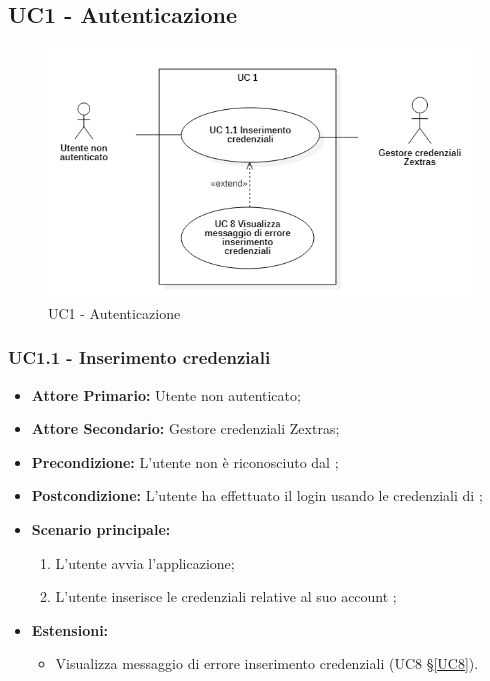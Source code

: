 \subsection{UC1 - Autenticazione}
\begin{figure}[H]
    \centering
    \includegraphics[scale = 0.7]{components/img/UC1.png}
    \caption{UC1 - Autenticazione}
\end{figure}
\subsubsection{UC1.1 - Inserimento credenziali}
\begin{itemize}
\item \textbf{Attore Primario:} Utente non autenticato;
\item \textbf{Attore Secondario:} Gestore credenziali Zextras;
\item \textbf{Precondizione:} L'utente non è riconosciuto dal ;
\item \textbf{Postcondizione:} L'utente ha effettuato il login usando le credenziali di ;
\item \textbf{Scenario principale:}
    \begin{enumerate}
    \item L'utente avvia l'applicazione;
    \item L'utente inserisce le credenziali relative al suo account ;
    \end{enumerate}
\item \textbf{Estensioni:}
\begin{itemize}
\item Visualizza messaggio di errore inserimento credenziali (UC8 \S{}\ref{UC8}).
\end{itemize}
\end{itemize}
